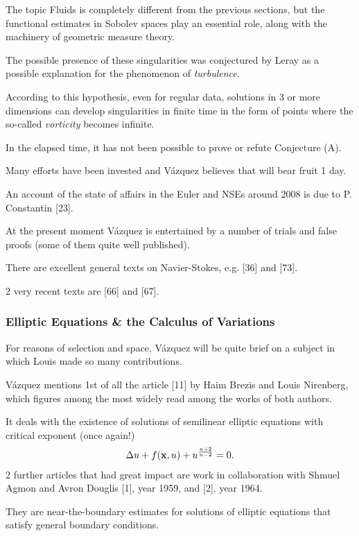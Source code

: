 \documentclass{article}
\begin{document}
The topic Fluids is completely different from the previous sections, but the functional estimates in Sobolev spaces play an essential role, along with the machinery of geometric measure theory.

%
The possible presence of these singularities was conjectured by Leray as a possible explanation for the phenomenon of \textit{turbulence}.

According to this hypothesis, even for regular data, solutions in 3 or more dimensions can develop singularities in finite time in the form of points where the so-called \textit{vorticity} becomes infinite.

%
In the elapsed time, it has not been possible to prove or refute Conjecture (A).

Many efforts have been invested and V\'azquez believes that will bear fruit 1 day.

An account of the state of affairs in the Euler and NSEs around 2008 is due to P. Constantin [23].

At the present moment V\'azquez is entertained by a number of trials and false proofs (some of them quite well published).

There are excellent general texts on Navier-Stokes, e.g. [36] and [73].

2 very recent texts are [66] and [67].

\subsubsection{Elliptic Equations \& the Calculus of Variations}
For reasons of selection and space, V\'azquez will be quite brief on a subject in which Louis made so many contributions.

V\'azquez mentions 1st of all the article [11] by Haim Brezis and Louis Nirenberg, which figures among the most widely read among the works of both authors.

It deals with the existence of solutions of semilinear elliptic equations with critical exponent (once again!)
\begin{align*}
	\Delta u + f({\bf x},u) + u^{\frac{n + 2}{n - 2}} = 0.
\end{align*}
2 further articles that had great impact are work in collaboration with Shmuel Agmon and Avron Douglis [1], year 1959, and [2], year 1964.

They are near-the-boundary estimates for solutions of elliptic equations that satisfy general boundary conditions.
\end{document}

